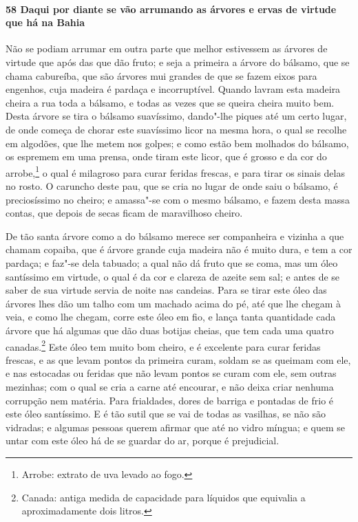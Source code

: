 \paragraph{58 Daqui por diante se vão arrumando as árvores e ervas de virtude que há na
Bahia}

Não se podiam arrumar em outra parte que melhor estivessem as árvores de virtude que após
das que dão fruto; e seja a primeira a árvore do bálsamo, que se chama cabureíba, que são
árvores mui grandes de que se fazem eixos para engenhos, cuja madeira é pardaça e
incorruptível. Quando lavram esta madeira cheira a rua toda a bálsamo, e todas as vezes
que se queira cheira muito bem. Desta árvore se tira o bálsamo suavíssimo, dando"-lhe
piques até um certo lugar, de onde começa de chorar este suavíssimo licor na mesma hora, o
qual se recolhe em algodões, que lhe metem nos golpes; e como estão bem molhados do
bálsamo, os espremem em uma prensa, onde tiram este licor, que é grosso e da cor do
arrobe,\footnote{ Arrobe: extrato de uva levado ao fogo.} o qual é milagroso para curar
feridas frescas, e para tirar os sinais delas no rosto. O caruncho deste pau, que se cria
no lugar de onde saiu o bálsamo, é preciosíssimo no cheiro; e amassa"-se com o mesmo
bálsamo, e fazem desta massa contas, que depois de secas ficam de maravilhoso cheiro.

De tão santa árvore como a do bálsamo merece ser companheira e vizinha a que chamam
copaiba, que é árvore grande cuja madeira não é muito dura, e tem a cor pardaça; e faz"-se
dela tabuado; a qual não dá fruto que se coma, mas um óleo
santíssimo em virtude, o qual é da cor e clareza de azeite sem sal; e antes de se saber de
sua virtude servia de 
noite nas candeias. Para se tirar este óleo das árvores lhes dão um talho com um machado
acima do pé, até que lhe chegam à veia, e como lhe chegam, corre este óleo em fio, e lança
tanta quantidade cada árvore que há algumas que dão duas botijas cheias, que tem cada uma
quatro canadas.\footnote{ Canada: antiga medida de capacidade para líquidos que equivalia
a aproximadamente dois litros.} Este óleo tem muito bom cheiro, e é excelente para curar
feridas frescas, e as que levam pontos da primeira curam, soldam se as queimam com ele, e
nas estocadas ou feridas que não levam pontos se curam com ele, sem outras mezinhas; com o
qual se cria a carne até encourar, e não deixa criar nenhuma corrupção nem matéria. Para
frialdades, dores de barriga e pontadas de frio é este óleo santíssimo. E é tão sutil que
se vai de todas as vasilhas, se não são vidradas; e algumas pessoas querem afirmar que até
no vidro míngua; e quem se untar com este óleo há de se guardar do ar, porque é
prejudicial.

